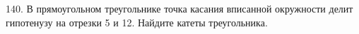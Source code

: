 140. В прямоугольном треугольнике точка касания вписанной окружности делит гипотенузу на отрезки 5 и 12. Найдите катеты треугольника.\\
